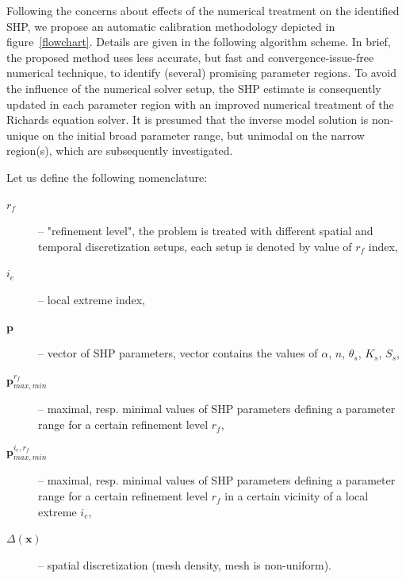\documentclass[review,times,3p,twocolumn,10pt]{elsarticle}
\renewcommand{\vec}{\mathbf}
\begin{document}
Following the concerns about effects of the numerical treatment on the identified SHP, we propose an automatic calibration methodology depicted in figure~\ref{flowchart}. Details are given in the following algorithm scheme. In brief, the proposed method uses less accurate, but fast and convergence-issue-free numerical technique, to identify (several) promising parameter regions. To avoid the influence of the numerical solver setup,  the SHP estimate is consequently updated in each parameter region with an improved numerical treatment of the Richards equation solver. It is presumed that the inverse model solution is non-unique on the initial broad parameter range, but unimodal on the narrow region(s), which are subsequently investigated. 

Let us define the following nomenclature: %

\hrulefill
\begin{description}
\item[$r_f$] -- "refinement level", the problem is treated with different spatial and temporal discretization setups, each setup is denoted by value of $r_f$ index,
\item[$i_e$] -- local extreme index,
\item[$\vec{p}$] -- vector of SHP parameters, vector contains the values of $\alpha$, $n$, $\theta_s$, $K_s$, $S_s$,
\item[$\vec{p}_{max,min}^{r_f}$] -- maximal, resp. minimal values of SHP parameters defining a parameter range for a certain refinement level $r_f$,
\item[$\vec{p}_{max,min}^{ i_e, r_f}$] -- maximal, resp. minimal values of SHP parameters defining a parameter range for a certain refinement level $r_f$ in a certain vicinity of a local extreme $i_e$,
\item[$\Delta(\vec{x})$] -- spatial discretization (mesh density, mesh is non-uniform).
\end{description}
\hrulefill
\end{document}
